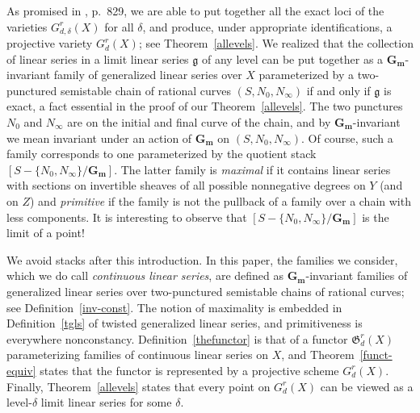 \documentclass[a4paper,11pt]{amsart}
\theoremstyle{plain}
\theoremstyle{definition}
\theoremstyle{remark}
\def\cc{{\mathbf G}_{\mathbf m}}
\begin{document}
As promised in \cite{ENR}, p.~829, we are able to put together all the exact loci of the varieties $G^r_{d,\delta}(X)$ for all $\delta$, and produce, under appropriate identifications, a projective variety $G^r_d(X)$; see Theorem~\ref{allevels}. We realized that the collection of linear series in a limit linear series $\mathfrak g$ of any level can be put together as a $\cc$-invariant family of generalized linear series over $X$ parameterized by a two-punctured semistable chain of rational curves $(S,N_0,N_{\infty})$ if and only if $\mathfrak g$ is exact, a fact essential in the proof of our Theorem~\ref{allevels}. The two punctures $N_0$ and $N_{\infty}$ are on the initial and final curve of the chain, and by $\cc$-invariant we mean invariant under an action of $\cc$ on $(S,N_0,N_{\infty})$. Of course, such a family corresponds to one parameterized by the quotient stack $[S-\{N_0,N_{\infty}\}/\cc]$. The latter family is \emph{maximal} if it contains linear series with sections on invertible sheaves of all possible nonnegative degrees on $Y$ (and on $Z$) and \emph{primitive} if the family is not the pullback of a family over a chain with less components. It is interesting to observe that $[S-\{N_0,N_{\infty}\}/\cc]$ is the limit of a point! 

We avoid stacks after this introduction. In this paper, the families we consider, which we do call \emph{continuous linear series}, are defined as $\cc$-invariant families of generalized linear series over two-punctured semistable chains of rational curves; see Definition~\ref{inv-const}. The notion of maximality is embedded in Definition~\ref{tgls} of twisted generalized linear series, and primitiveness is everywhere nonconstancy. Definition~\ref{thefunctor} is that of a functor $\mathfrak{G}_d^r(X)$ parameterizing families of continuous linear series on $X$, and Theorem~\ref{funct-equiv} states that the functor is represented by a projective scheme $G^r_d(X)$. Finally, Theorem~\ref{allevels} states that every point on $G^r_d(X)$ can be viewed as a level-$\delta$ limit linear series for some $\delta$.
\end{document}
